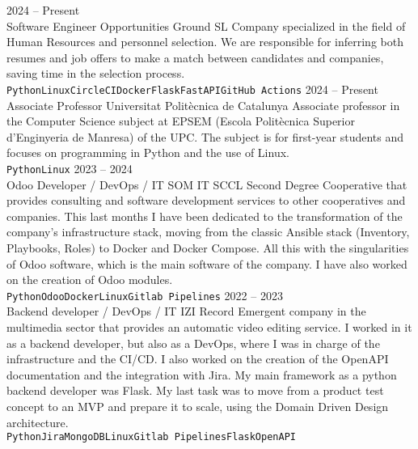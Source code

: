 \documentclass[9pt]{developercv} %
\begin{document}
\begin{entrylist}
	\entry
	{2024 -- Present\\}
	{Software Engineer}
	{Opportunities Ground SL}
	{Company specialized in the field of Human Resources and personnel selection. We are responsible for inferring both resumes and job offers to make a match between candidates and companies, saving time in the selection process.
		\\ \texttt{Python}\slashsep\texttt{Linux}\slashsep\texttt{CircleCI}\slashsep\texttt{Docker}\slashsep\texttt{Flask}\slashsep\texttt{FastAPI}\slashsep\texttt{GitHub Actions}}
	\entry
	{2024 -- Present\\}
	{Associate Professor}
	{Universitat Politècnica de Catalunya}
	{Associate professor in the Computer Science subject at EPSEM (Escola Politècnica Superior d'Enginyeria de Manresa) of the UPC. The subject is for first-year students and focuses on programming in Python and the use of Linux.
		\\ \texttt{Python}\slashsep\texttt{Linux}
	}
	\entry
	{2023 -- 2024\\}
	{Odoo Developer / DevOps / IT}
	{SOM IT SCCL}
	{Second Degree Cooperative that provides consulting and software development services to other cooperatives and companies.
		This last months I have been dedicated to the transformation of the company's infrastructure stack, moving from the classic Ansible stack (Inventory, Playbooks, Roles) to Docker and Docker Compose. All this with the singularities of Odoo software, which is the main software of the company. I have also worked on the creation of Odoo modules.
		\\ \texttt{Python}\slashsep\texttt{Odoo}\slashsep\texttt{Docker}\slashsep\texttt{Linux}\slashsep\texttt{Gitlab Pipelines}
	}
	\entry
	{2022 -- 2023\\}
	{Backend developer / DevOps / IT}
	{IZI Record}
	{Emergent company in the multimedia sector that provides an automatic video editing service.
		I worked in it as a backend developer, but also as a DevOps, where I was in charge of the infrastructure and the CI/CD. I also worked on the creation of the OpenAPI documentation and the integration with Jira. My main framework as a python backend developer was Flask. My last task was to move from a product test concept to an MVP and prepare it to scale, using the Domain Driven Design architecture.
		\\ \texttt{Python}\slashsep\texttt{Jira}\slashsep\texttt{MongoDB}\slashsep\texttt{Linux}\slashsep\texttt{Gitlab Pipelines}\slashsep\texttt{Flask}\slashsep\texttt{OpenAPI}
}
\end{entrylist}
\end{document}
